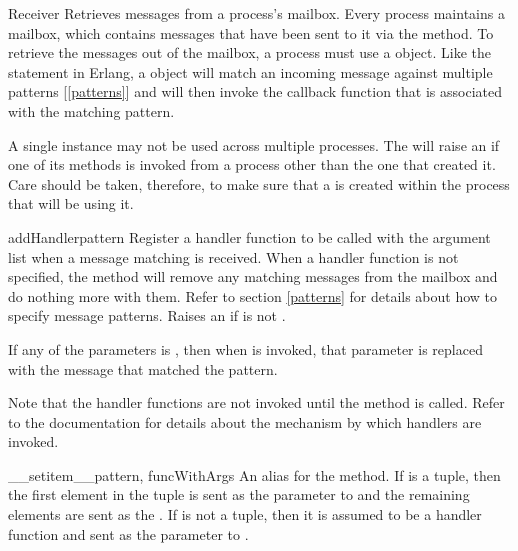 \documentclass{howto}
\begin{document}
\begin{classdesc}{Receiver}{}
Retrieves messages from a process's mailbox. Every process maintains a mailbox,
which contains messages that have been sent to it via the 
method. To retrieve the messages out of the mailbox, a process must use a
 object. Like the  statement in Erlang, a
 object will match an incoming message against multiple patterns
[\ref{patterns}] and will then invoke the callback function that is associated
with the matching pattern.

A single  instance may not be used across multiple processes.
The  will raise an  if one of its
methods is invoked from a process other than the one that created it. Care
should be taken, therefore, to make sure that a  is created
within the process that will be using it.

\begin{methoddesc}{addHandler}{pattern}
Register a handler function  to be called with the  argument
list when a message matching  is received. When a handler function
 is not specified, the  method will remove any
matching messages from the mailbox and do nothing more with them. Refer to
section \ref{patterns} for details about how to specify message patterns. Raises
an  if  is not .

If any of the  parameters is , then when
 is invoked, that parameter is replaced with the message that matched
the pattern.

Note that the handler functions are not invoked until the 
method is called. Refer to the  documentation for details
about the mechanism by which handlers are invoked.
\end{methoddesc}

\begin{methoddesc}{__setitem__}{pattern, funcWithArgs}
\opindex{[]}
An alias for the  method. If  is a tuple,
then the first element in the tuple is sent as the  parameter to
 and the remaining elements are sent as the . If
 is not a tuple, then it is assumed to be a handler function
and sent as the  parameter to .


\end{methoddesc}
\end{classdesc}
\end{document}

